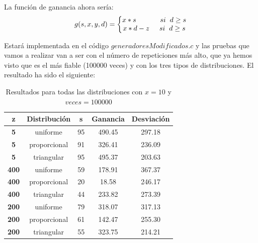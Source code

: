 \documentclass[11pt,a4paper]{report}
\begin{document}
La función de ganancia ahora sería:
\begin{equation}
	g(s,x,y,d)=\left\{\begin{matrix}
	x*s\hspace{12mm}si\hspace{2mm}d\geq s\\ 
	x*d-z\hspace{5mm}si\hspace{2mm}d\geq s
	\end{matrix}\right.
\end{equation}

Estará implementada en el código $generadoresModificados.c$ y las pruebas que vamos a realizar van a ser con el número de repeticiones más alto, que ya
hemos visto que es el más fiable (100000 veces) y con los tres tipos de distribuciones. El resultado ha sido el siguiente:

\begin{table}[H]
	\centering
	\begin{tabular}{c|cccc}
	\textbf{\hspace{5mm}z\hspace{5mm}}   & \textbf{Distribución} & \textbf{\hspace{5mm}s\hspace{5mm}} & \textbf{Ganancia} & \textbf{Desviación} \\ \hline
	\textbf{5}   & uniforme 			 & 95         & 490.45            & 297.18 			  \\
	\textbf{5}   & proporcional			 & 91         & 326.41            & 236.09			  \\
	\textbf{5}   & triangular 			 & 95         & 495.37            & 203.63			  \\ \hline
	\textbf{400} & uniforme 			 & 59         & 178.91            & 367.37 			  \\
	\textbf{400} & proporcional			 & 20         & 18.58             & 246.17			  \\
	\textbf{400} & triangular 		     & 44         & 233.82            & 273.39			  \\ \hline
	\textbf{200} & uniforme 			 & 79         & 318.07            & 317.13 			  \\
	\textbf{200} & proporcional		     & 61         & 142.47            & 255.30			  \\
	\textbf{200} & triangular 		     & 55         & 323.75            & 214.21			  \\
	\end{tabular}
	\caption{Resultados para todas las distribuciones con $x=10$ y $veces=100000$}
\end{table}
\end{document}
